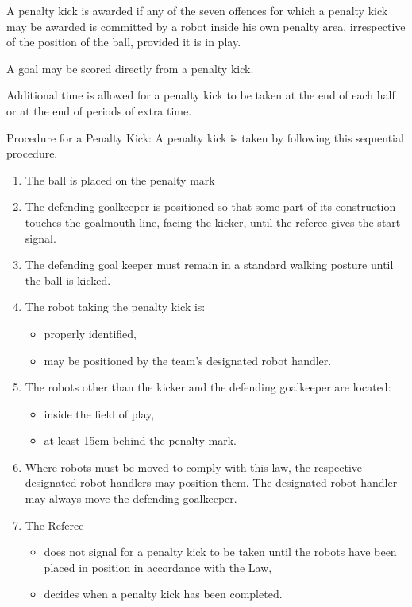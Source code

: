 \documentclass[12pt]{hurocup}
\begin{document}
\begin{lawlist}[US]
  
\item A penalty kick is awarded if any of the seven offences for which
  a penalty kick may be awarded is committed by a robot inside his own
  penalty area, irrespective of the position of the ball, provided it
  is in play.
  
\item A goal may be scored directly from a penalty kick.
  
\item Additional time is allowed for a penalty kick to be taken at the
  end of each half or at the end of periods of extra time.
  
\item Procedure for a Penalty Kick: A penalty kick is taken by
  following this sequential procedure.
  \begin{enumerate}
    \item The ball is placed on the penalty mark
    \item  The defending goalkeeper is positioned so that some part of
      its construction touches the goalmouth line, facing the kicker,
      until the referee gives the start signal.
    \item The defending goal keeper must remain in a standard walking
      posture until the ball is kicked.
    \item The robot taking the penalty kick is: 
      \begin{itemize}
      \item properly identified,
      \item may be positioned by the team's designated robot handler.
      \end{itemize}
    \item The robots other than the kicker and the defending goalkeeper
      are located:
      \label{pk-other-players}
      \begin{itemize}
      \item inside the field of play,
      \item at least 15cm behind the penalty mark.
      \end{itemize}
    \item Where robots must be moved to comply with this law, the
      respective designated robot handlers may position them. The
      designated robot handler may always move the defending goalkeeper. 
    \item The Referee
      \begin{itemize}
      \item does not signal for a penalty kick to be taken until the
        robots have been placed in position in accordance with the Law,
      \item decides when a penalty kick has been completed.
      \end{itemize}
  \end{enumerate}   
  

\end{lawlist}
\end{document}
